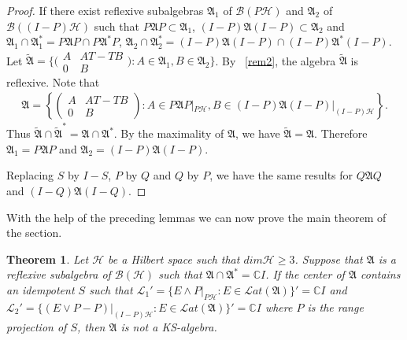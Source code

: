 \documentclass[a4paper,10pt]{amsart}
\newtheorem{theorem}{Theorem}[section]
\theoremstyle{refs}
\newcommand{\AAA}{\mathfrak A}
\newcommand{\BBB}{\mathcal B}
\newcommand{\HHH}{\mathcal H} %
\newcommand{\LLL}{\mathcal L} %
\newcommand{\Lat}{\mathcal Lat}
\newcommand{\C}{\mathbb C} %
\begin{document}
\begin{proof}
If there exist reflexive subalgebras $\AAA_1$ of $\BBB(P\HHH)$ and
$\AAA_2$ of $\BBB((I-P)\HHH)$ such that $P \AAA P \subset \AAA_1 $,
$(I-P)\AAA(I-P) \subset \AAA_2$ and
$\AAA_1 \cap \AAA_1^{*}= P \AAA P \cap P\AAA^{*} P$, $\AAA_2 \cap
\AAA_2^{*}=(I-P) \AAA (I-P)\cap(I-P)\AAA^{*} (I-P)$. Let
$\widetilde{\AAA}= \{
\bigl(\begin{smallmatrix}
           A & AT-TB\\
           0 & B
           \end{smallmatrix} \bigr) : A
\in \AAA_1, B \in \AAA_2 \}$. By ~\cref{rem2}, the algebra
$\widetilde{\AAA}$ is reflexive. Note that
\begin{align*}
\AAA = \left \{\begin{pmatrix} A &
AT-TB \\ 0 & B \end{pmatrix}: A \in
P\AAA P|_{P\HHH}, B \in (I-P)\AAA(I-P)|_{(I-P)\HHH} \right \}.
\end{align*}
Thus $\widetilde{\AAA}\cap\widetilde{\AAA}^{*} = \AAA\cap\AAA^{*}$.
By the maximality of $\AAA$, we have $\widetilde{\AAA} = \AAA$. Therefore
$\AAA_1 = P \AAA P$ and $\AAA_2 = (I-P) \AAA (I-P)$.

Replacing $S$ by $I-S$, $P$ by $Q$ and $Q$ by $P$, we have the same results for
$Q \AAA Q$ and $(I-Q)\AAA (I-Q)$.
\end{proof}

With the help of the preceding lemmas we can now prove the
main theorem of the section.

\begin{theorem} \label{thm1}
Let $\HHH$ be a Hilbert space such that $dim\HHH \geq 3$.
Suppose that $\AAA$ is a reflexive subalgebra of $\BBB(\HHH)$ such that
$\AAA \cap \AAA^{*} = \C I$.
If the center of $\AAA$ contains an idempotent $S$ such that
$\LLL_{1}' = \{E \wedge P |_{P\HHH} : E \in \Lat(\AAA)\}' = \C I$ and
$\LLL_{2}' =\{ (E \vee P - P)|_{(I-P)\HHH} : E \in\Lat(\AAA)\}' = \C I$ where
$P$ is the range
projection of $S$, then $\AAA$ is not a KS-algebra.
\end{theorem}
\end{document}
